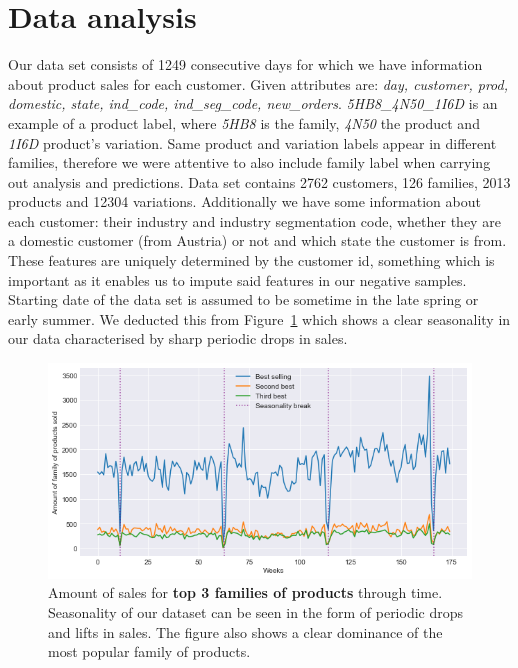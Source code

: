 \documentclass[fleqn,moreauthors,10pt]{ds_report}
\begin{document}


\section*{Data analysis}

Our data set consists of 1249 consecutive days for which we have information about product sales for each customer. Given attributes are: \textit{day, customer, prod, domestic, state, ind\_code, ind\_seg\_code, new\_orders}. \textit{5HB8\_4N50\_1I6D} is an example of a product label, where \textit{5HB8} is the family, \textit{4N50} the product and \textit{1I6D} product's variation. Same product and variation labels appear in different families, therefore we were attentive to also include family label when carrying out analysis and predictions. Data set contains 2762 customers, 126 families, 2013 products and 12304 variations. Additionally we have some information about each customer: their industry and industry segmentation code, whether they are a domestic customer (from Austria) or not and which state the customer is from. These features are uniquely determined by the customer id, something which is important as it enables us to impute said features in our negative samples. Starting date of the data set is assumed to be sometime in the late spring or early summer. We deducted this from Figure~\ref{top} which shows a clear seasonality in our data characterised by sharp periodic drops in sales.

\begin{figure}[hbt]\centering
	\includegraphics[width=\linewidth]{top_products.png}
	\caption{Amount of sales for \textbf{top 3 families of products} through time. Seasonality of our dataset can be seen in the form of periodic drops and lifts in sales. The figure also shows a clear dominance of the most popular family of products.}
	\label{top}
\end{figure}
\end{document}

